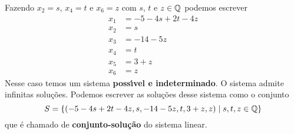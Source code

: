 \begin{exemplos}
\begin{solucao}
\begin{enumerate}
            Fazendo $x_2 = s$, $x_4 = t$ e $x_6 = z$ com $s$, $t$ e $z \in \mathbb{Q}$ podemos escrever
            \begin{align*}
                x_1 &= -5 - 4s + 2t - 4z\\
                x_2 &= s\\
                x_3 &= -14 - 5z\\
                x_4 &= t\\
                x_5 &= 3 + z\\
                x_6 &= z
            \end{align*}
            Nesse caso temos um sistema \textbf{poss{\'\i}vel e indeterminado}. O sistema admite infinitas solu\c{c}\~oes. Podemos escrever as solu\c{c}\~oes desse sistema como o conjunto
            \[
                S = \{(-5 - 4s + 2t - 4z, s, -14 - 5z, t, 3 + z, z) \mid s, t, z \in \mathbb{Q}\}
            \]
            que \'e chamado de \textbf{conjunto-solu\c{c}\~ao} do sistema linear.


\end{enumerate}
\end{solucao}
\end{exemplos}
